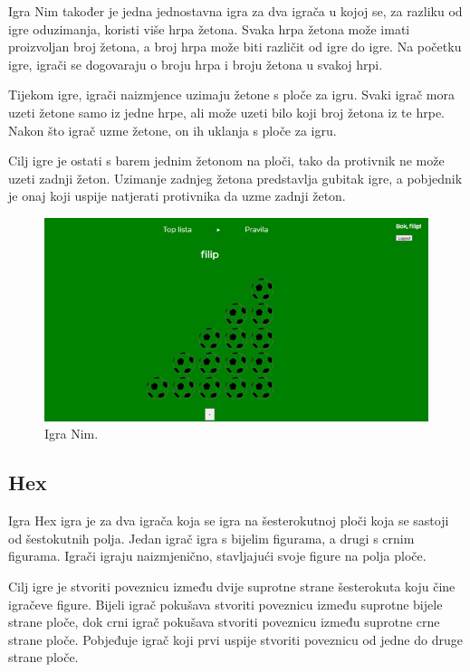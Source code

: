 Igra Nim također je jedna jednostavna igra za dva igrača u kojoj se, za razliku od igre oduzimanja, koristi više hrpa žetona. Svaka hrpa žetona može imati proizvoljan broj žetona, a broj hrpa može biti različit od igre do igre. Na početku igre, igrači se dogovaraju o broju hrpa i broju žetona u svakoj hrpi.

Tijekom igre, igrači naizmjence uzimaju žetone s ploče za igru. Svaki igrač mora uzeti žetone samo iz jedne hrpe, ali može uzeti bilo koji broj žetona iz te hrpe. Nakon što igrač uzme žetone, on ih uklanja s ploče za igru.

Cilj igre je ostati s barem jednim žetonom na ploči, tako da protivnik ne može uzeti zadnji žeton. Uzimanje zadnjeg žetona predstavlja gubitak igre, a pobjednik je onaj koji uspije natjerati protivnika da uzme zadnji žeton.

\begin{figure}[H]
\centering
\includegraphics[width=14cm]{slike-program/Slika6.png}
\caption{Igra Nim.}
\label{}
\end{figure}


\subsection*{Hex}

Igra Hex igra je za dva igrača koja se igra na šesterokutnoj ploči koja se sastoji od šestokutnih polja. Jedan igrač igra s bijelim figurama, a drugi s crnim figurama. Igrači igraju naizmjenično, stavljajući svoje figure na polja ploče.

Cilj igre je stvoriti poveznicu između dvije suprotne strane šesterokuta koju čine igračeve figure. Bijeli igrač pokušava stvoriti poveznicu između suprotne bijele strane ploče, dok crni igrač pokušava stvoriti poveznicu između suprotne crne strane ploče. Pobjeđuje igrač koji prvi uspije stvoriti poveznicu od jedne do druge strane ploče.


